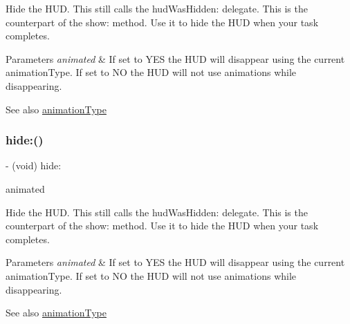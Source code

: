 Hide the H\+UD. This still calls the hud\+Was\+Hidden\+: delegate. This is the counterpart of the show\+: method. Use it to hide the H\+UD when your task completes.


\begin{DoxyParams}{Parameters}
{\em animated} & If set to Y\+ES the H\+UD will disappear using the current animation\+Type. If set to NO the H\+UD will not use animations while disappearing.\\
\hline
\end{DoxyParams}
\begin{DoxySeeAlso}{See also}
\mbox{\hyperlink{interface_m_b_progress_h_u_d_a71d04bb9e2839df9377ad10d03b2e468}{animation\+Type}} 
\end{DoxySeeAlso}
\mbox{\label{interface_m_b_progress_h_u_d_a500fd79859e56cf98fd2eebfd37b4204}} 
\subsubsection{\texorpdfstring{hide\+:()}{hide:()}\hspace{0.1cm}{\footnotesize\ttfamily [3/3]}}
{\footnotesize\ttfamily -\/ (void) hide\+: \begin{DoxyParamCaption}\item[{(B\+O\+OL)}]{animated }\end{DoxyParamCaption}}

Hide the H\+UD. This still calls the hud\+Was\+Hidden\+: delegate. This is the counterpart of the show\+: method. Use it to hide the H\+UD when your task completes.


\begin{DoxyParams}{Parameters}
{\em animated} & If set to Y\+ES the H\+UD will disappear using the current animation\+Type. If set to NO the H\+UD will not use animations while disappearing.\\
\hline
\end{DoxyParams}
\begin{DoxySeeAlso}{See also}
\mbox{\hyperlink{interface_m_b_progress_h_u_d_a71d04bb9e2839df9377ad10d03b2e468}{animation\+Type}} 
\end{DoxySeeAlso}
\mbox{\label{interface_m_b_progress_h_u_d_a4181ac00f5f1ef95bcfab6749e1642e6}} 
